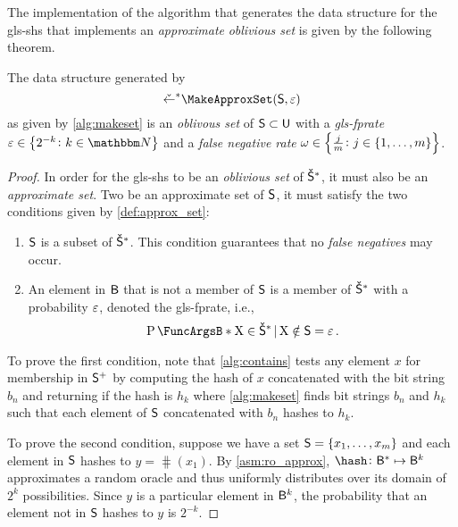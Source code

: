 \documentclass[ ../main.tex]{subfiles}
\begin{document}
The implementation of the algorithm that generates the data structure for the \gls{gls-shs} that implements an \emph{approximate} \emph{oblivious set} is given by the following theorem.
\begin{theorem}
The data structure generated by
\begin{equation}
    \OASet \gets \MakeApproxSet(\Set{S},\fprate)
\end{equation}
as given by \cref{alg:makeset} is an \emph{oblivous set} of $\Set{S} \subset \Set{U}$ with a \emph{\gls{gls-fprate}} $\fprate \in \left\{2^{-k} \colon k \in \NatSet\right\}$ and a \emph{false negative rate} $\omega \in \left\{\frac{j}{m} \colon j \in \{1,\ldots,m\}\right\}$.
\end{theorem}
\begin{proof}
In order for the \gls{gls-shs} to be an \emph{oblivious set} of $\OASet{S}$, it must also be an \emph{approximate set}. Two be an approximate set of $\Set{S}$, it must satisfy the two conditions given by \cref{def:approx_set}:
\begin{enumerate}
    \item $\Set{S}$ is a subset of $\OASet{S}$. This condition guarantees that no \emph{false negatives} may occur.
    \item An element in $\Set{B}$ that is not a member of $\Set{S}$ is a member of $\OASet{S}$ with a probability $\varepsilon$, denoted the \gls{gls-fprate}, i.e.,
    \begin{equation}
        \Prob{\RV{X} \in \OASet{S} \given \RV{X} \notin \Set{S}} = \fprate\,.
    \end{equation}
\end{enumerate}

To prove the first condition, note that \cref{alg:contains} tests any element $x$ for membership in $\PASet{S}$ by computing the hash of $x$ concatenated with the bit string $b_n$ and returning \True if the hash is $h_k$ where \cref{alg:makeset} finds bit strings $b_n$ and $h_k$ such that each element of $\Set{S}$ concatenated with $b_n$ hashes to $h_k$.

To prove the second condition, suppose we have a set $\Set{S} = \{x_1,\ldots,x_m\}$ and each element in $\Set{S}$ hashes to $y = \hash(x_1)$. By \cref{asm:ro_approx}, $\hash \colon \Set{B}^* \mapsto \Set{B}^k$ approximates a random oracle and thus uniformly distributes over its domain of $2^k$ possibilities. Since $y$ is a particular element in $\Set{B}^k$, the probability that an element not in $\Set{S}$ hashes to $y$ is $2^{-k}$.
\end{proof}
\end{document}
